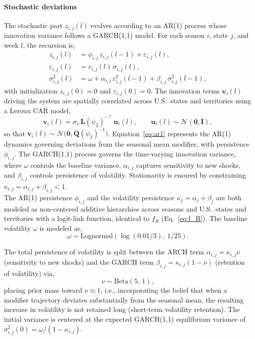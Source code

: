 \documentclass[11pt]{article}
\newcommand{\Normal}{\mathcal{N}}
\newcommand{\Lognormal}{\text{Lognormal}}
\begin{document}
\paragraph{Stochastic deviations}
The stochastic part $z_{i,j}(l)$ evolves according to an AR(1) process whose innovation variance follows a GARCH(1,1) model. For each season $i$, state $j$, and week $l$, the recursion is,
\begin{align}
	z_{i,j}(l) &= \phi_{i,j} \,z_{i,j}(l-1) + \varepsilon_{i,j}(l), \\ \label{eq:ar1}
	\varepsilon_{i,j}(l) &= v_{i,j}(l)\,\sigma_{i,j}(l), \\
    \sigma^2_{i,j}(l) &= \omega + \alpha_{i,j}\,\varepsilon^2_{i,j}(l-1) + \beta_{i,j}\,\sigma^2_{i,j}(l-1),
\end{align}
with initialization $z_{i,j}(0) = 0$ and $\varepsilon_{i,j}(0) = 0$. The innovation terms $\bm{v}_i(l)$ driving the system are spatially correlated across U.S.\ states and territories using a Leroux CAR model,
\begin{equation}
    \bm{v}_i(l) = \sigma_v \, \bm{L}(\psi_2)^{-\top}\, \bm{u}_i(l), 
    \qquad \bm{u}_i(l) \sim \Normal(\bm{0}, \bm{I}),
\end{equation}
so that $\bm{v}_i(l) \sim \Normal\big(\bm{0}, \bm{Q}(\psi_2)^{-1}\big)$. Equation~\eqref{eq:ar1} represents the AR(1) dynamics governing deviations from the seasonal mean modifier, with persistence $\phi_{i,j}$. The GARCH(1,1) process governs the time-varying innovation variance, where $\omega$ controls the baseline variance, $\alpha_{i,j}$ captures sensitivity to new shocks, and $\beta_{i,j}$ controls persistence of volatility. Stationarity is ensured by constraining $\kappa_{i,j} = \alpha_{i,j} + \beta_{i,j} < 1$.\\

The AR(1) persistence $\phi_{i,j}$ and the volatility persistence $\kappa_j = \alpha_j + \beta_j$ are both modeled as non-centered additive hierarchies across seasons and U.S.\ states and territories with a logit-link function, identical to $f_R$ (Eq.~\eqref{eq:f_R}). The baseline volatility $\omega$ is modeled as,
\begin{equation}
    \omega \sim \Lognormal\!\left(\log(0.01/3),\ 1/25\right).
\end{equation}

The total persistence of volatility is split between the ARCH term $\alpha_{i,j} = \kappa_{i,j} \nu$ (sensitivity to new shocks) and the GARCH term $\beta_{i,j} = \kappa_{i,j}(1-\nu)$ (retention of volatility) via,
\begin{equation}
    \nu \sim \text{Beta}(5,\, 1),
\end{equation}
placing prior mass toward $\nu \approx 1$, i.e., incorporating the belief that when a modifier trajectory deviates substantially from the seasonal mean, the resulting increase in volatility is not retained long (short-term volatility retention). The initial variance is centered at the expected GARCH(1,1) equilibrium variance of $\sigma^2_{i,j}(0) = \omega/(1-\kappa_{i,j})$.
\end{document}
